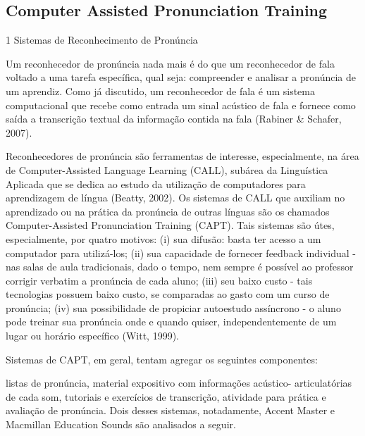 \subsection{Computer Assisted Pronunciation Training}

1 Sistemas de Reconhecimento de Pron\'uncia

Um reconhecedor de pron\'uncia nada mais \'e do que um reconhecedor de fala
voltado a uma tarefa espec\'ifica, qual seja: compreender e analisar a
pron\'uncia de um aprendiz. Como j\'a discutido, um reconhecedor de fala \'e
um sistema computacional que recebe como entrada um sinal ac\'ustico de
fala e fornece como sa\'ida a transcri\c{c}\~ao textual da informa\c{c}\~ao contida na
fala (Rabiner \& Schafer, 2007).

Reconhecedores de pron\'uncia s\~ao ferramentas de interesse, especialmente,
na \'area de Computer-Assisted Language Learning (CALL), sub\'area da
Lingu\'istica Aplicada que se dedica ao estudo da utiliza\c{c}\~ao de
computadores para aprendizagem de l\'ingua (Beatty, 2002). Os sistemas de
CALL que auxiliam no aprendizado ou na pr\'atica da pron\'uncia de outras
l\'inguas s\~ao os chamados Computer-Assisted Pronunciation Training (CAPT).
Tais sistemas s\~ao \'utes, especialmente, por quatro motivos: (i) sua
difus\~ao: basta ter acesso a um computador para utiliz\'a-los; (ii) sua
capacidade de fornecer feedback individual - nas salas de aula
tradicionais, dado o tempo, nem sempre \'e poss\'ivel ao professor corrigir
verbatim a pron\'uncia de cada aluno; (iii) seu baixo custo - tais
tecnologias possuem baixo custo, se comparadas ao gasto com um curso de
pron\'uncia; (iv) sua possibilidade de propiciar autoestudo ass\'incrono - o
aluno pode treinar sua pron\'uncia onde e quando quiser, independentemente
de um lugar ou hor\'ario espec\'ifico (Witt, 1999).

Sistemas de CAPT, em geral, tentam agregar os  seguintes  componentes:

listas de pron\'uncia, material expositivo com informa\c{c}\~oes ac\'ustico-
articulat\'orias de cada som, tutoriais e exerc\'icios de transcri\c{c}\~ao,
atividade para pr\'atica e avalia\c{c}\~ao de pron\'uncia. Dois desses sistemas,
notadamente, Accent Master e Macmillan Education Sounds s\~ao analisados a
seguir.

